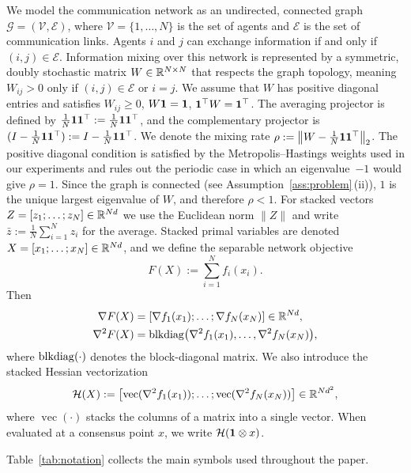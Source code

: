 \documentclass[review,onefignum,onetabnum]{siamart171218}
\begin{document}
	We model the communication network as an undirected, connected
	graph $\mathcal{G} = (\mathcal{V}, \mathcal{E})$, where
	$\mathcal{V} = \{1, \dots, N\}$ is the set of agents and
	$\mathcal{E}$ is the set of communication links.
	Agents $i$ and $j$ can exchange information if and only if
	$(i,j) \in \mathcal{E}$.
	Information mixing over this network is represented by a symmetric,
	doubly stochastic matrix $W \in \mathbb{R}^{N \times N}$ that respects
	the graph topology, meaning $W_{ij} > 0$ only if
	$(i,j) \in \mathcal{E}$ or $i=j$.
	We assume that $W$ has positive diagonal entries and satisfies
	$W_{ij}\ge0$, $W\mathbf{1}=\mathbf{1}$, $\mathbf{1}^\top W=\mathbf{1}^\top$.
	The averaging projector is defined by
	$\frac{1}{N}\mathbf{1}\mathbf{1}^\top:=\frac{1}{N}\mathbf{1}\mathbf{1}^\top$, and the complementary projector
	is $(I-\frac{1}{N}\mathbf{1}\mathbf{1}^\top):=I-\frac{1}{N}\mathbf{1}\mathbf{1}^\top$.
	We denote the mixing rate $\rho := \left\|W-\frac{1}{N}\mathbf{1}\mathbf{1}^\top\right\|_2$.
	The positive diagonal condition is satisfied by the
	Metropolis--Hastings weights used in our experiments and rules out
	the periodic case in which an eigenvalue~$-1$ would give $\rho=1$.
	Since the graph is connected (see Assumption~\ref{ass:problem}\,(ii)),
	$1$ is the unique largest eigenvalue of $W$, and therefore $\rho<1$.
	For stacked vectors $Z=[z_1;\dots;z_N]\in\mathbb{R}^{Nd}$ we use the
	Euclidean norm $\|Z\|$ and write $\bar z:=\frac1N\sum_{i=1}^N z_i$
	for the average.
	Stacked primal variables are denoted
	$X=[x_1;\dots;x_N]\in\mathbb{R}^{Nd}$, and we define the separable
	network objective
	\[
	F(X):=\sum_{i=1}^N f_i(x_i).
	\]
	Then
	\begin{align*}
		\nabla F(X)&=[\nabla f_1(x_1);\dots;\nabla f_N(x_N)]\in\mathbb{R}^{Nd},\\
		\nabla^2 F(X)&=\operatorname{blkdiag}\bigl(\nabla^2 f_1(x_1),\dots,\nabla^2 f_N(x_N)\bigr),
	\end{align*}
	where $\operatorname{blkdiag}(\cdot)$ denotes the block-diagonal matrix.
	We also introduce the stacked Hessian vectorization
	\[
	\mathcal H(X):=\bigl[\operatorname{vec}(\nabla^2 f_1(x_1));\dots;\operatorname{vec}(\nabla^2 f_N(x_N))\bigr]\in\mathbb{R}^{Nd^2},
	\]
	where $\operatorname{vec}(\cdot)$ stacks the columns of a matrix into a single vector.
	When evaluated at a consensus point $x$, we write $\mathcal H(\mathbf{1}\otimes x)$.
	
	Table~\ref{tab:notation} collects the main symbols used
	throughout the paper.
	
\end{document}
